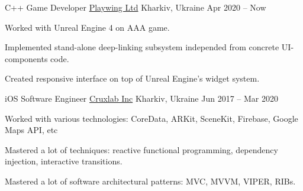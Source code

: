 


\begin{cventries}


\cventry
{C++ Game Developer} %
{\href{https://playwing.com}{Playwing Ltd}} %
{Kharkiv, Ukraine} %
{Apr 2020 -- Now} %
{ %
\begin{cvitems}
    \item Worked with Unreal Engine 4 on AAA game.
    \item Implemented stand-alone deep-linking subsystem independed from concrete UI-components code.
    \item Created responsive interface on top of Unreal Engine's widget system.
\end{cvitems}
}


\cventry
{iOS Software Engineer} %
{\href{https://cruxlab.com/}{Cruxlab Inc}} %
{Kharkiv, Ukraine} %
{Jun 2017 -- Mar 2020} %
{ %
\begin{cvitems}
    \item Worked with various technologies: CoreData, ARKit, SceneKit, Firebase, Google Maps API, etc
    \item Mastered a lot of techniques: reactive functional programming, dependency injection, interactive transitions.
    \item Mastered a lot of software architectural patterns: MVC, MVVM, VIPER, RIBs.
\end{cvitems}
}


\end{cventries}
